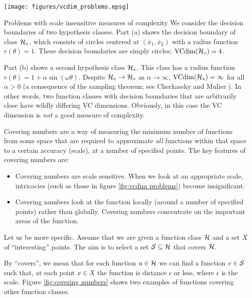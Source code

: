\begin{linefigure}
\begin{center}
\texttt{[image: figures/vcdim\_problems.epsg]}
\end{center}
\begin{capt}{Problems with scale insensitive measures of complexity}
We consider the decision boundaries of two hypothesis classes.  Part
(a) shows the decision boundary of class $\mathcal{H}_{\circ}$,
which consists of circles centered at $(\bar{x}_1, \bar{x}_2)$ with a
radius function $r(\theta) = 1$.  These decision boundaries are simply
circles; $\mathrm{VCdim}(\mathcal{H}_{\circ}) = 4$.

Part (b) shows a second hypothesis class $\mathcal{H}_{\ast}$.  This class
has a radius function $r(\theta) = 1 + \alpha \sin(\omega \theta)$.
Despite $\mathcal{H}_{\circ} \rightarrow \mathcal{H}_{\ast}$ as $\alpha
\rightarrow \infty$, $\mathrm{VCdim}(\mathcal{H}_{\ast}) = \infty$ for all $\alpha >
0$ (a consequence of the sampling theorem; see Cherkassky and Mulier
\cite{Cherkassky98}).  In other words, two function classes with
decision boundaries that are arbitrarily close have wildly differing
VC dimensions.  Obviously, in this case the VC dimension is \emph{not} a
good measure of complexity.
\end{capt}
\label{fig:vcdim problems}
\end{linefigure}

Covering numbers are a way of measuring the minimum number of
functions from some space that are required to approximate \emph{all}
functions within that space to a certain accuracy (scale), at a number
of specified points.  The key features of covering numbers are:
%
\begin{itemize}
\item	Covering numbers are scale sensitive.  When we look at an
	appropriate scale, intricacies (such as those in figure
	\ref{fig:vcdim problems}) become insignificant.
\item	Covering numbers look at the function locally (around a number
	of specified points) rather than globally.  Covering
	numbers concentrate on the important areas of the function.
\end{itemize}

Let us be more specific.  Assume that we are given a function class
$\mathcal{H}$ and a set $X$ of ``interesting'' points.  The aim is to select
a set $\mathcal{S} \subseteq \mathcal{H}$ that covers $\mathcal{H}$.

By ``covers'', we  mean that for each function $u \in \mathcal{H}$ we can
find a function $v \in \mathcal{S}$ such that, at each point $x \in X$ the
function is distance $\epsilon$ or less, where $\epsilon$ is the
scale.  Figure \ref{fig:covering numbers} shows two examples of
functions covering other function classes.

